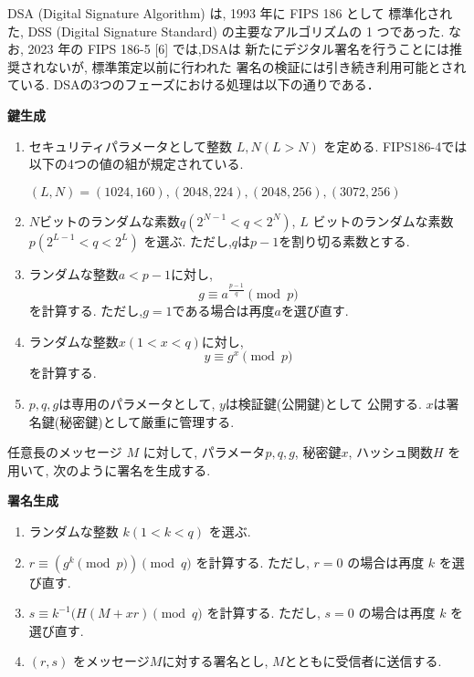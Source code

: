 DSA (Digital Signature Algorithm) は, 1993 年に FIPS 186 として
標準化された, DSS (Digital Signature Standard) の主要なアルゴリズムの
 1 つであった. なお, 2023 年の FIPS 186-5 [6] では,DSAは
新たにデジタル署名を行うことには推奨されないが, 標準策定以前に行われた
署名の検証には引き続き利用可能とされている.
DSAの3つのフェーズにおける処理は以下の通りである．

\let\ltxlist\list
\begin{breakitembox}[l]{\textbf{鍵生成}}
  　
  \begin{enumerate}[parsep=7pt]
    \item セキュリティパラメータとして整数 $L,N (L>N)$ を定める. 
    FIPS186-4では以下の4つの値の組が規定されている.
    \begin{center}
      $(L,N) = (1024,160), (2048,224), (2048,256), (3072,256)$
    \end{center}
    \item $N$ビットのランダムな素数$q(2^{N-1}<q<2^{N})$, 
    $L$ ビットのランダムな素数$p(2^{L-1}<q<2^{L})$ を選ぶ.
    ただし,$q$は$p-1$を割り切る素数とする.
    \item ランダムな整数$a<p-1$に対し,
    \begin{equation}
      g\equiv a^{\frac{p-1}{q}}\pmod p
    \end{equation} 
    を計算する. ただし,$g=1$である場合は再度$a$を選び直す.
    \item ランダムな整数$x(1<x<q)$に対し,
    \begin{equation}
      y\equiv g^x\pmod p
    \end{equation}
    を計算する.
    \item $p,q,g$は専用のパラメータとして, $y$は検証鍵(公開鍵)として
    公開する. $x$は署名鍵(秘密鍵)として厳重に管理する.
  \end{enumerate}
\end{breakitembox}
\vspace{1m}
\indent 任意長のメッセージ $M$ に対して, パラメータ$p, q, g$, 秘密鍵$x$, 
ハッシュ関数$H$ を用いて, 次のように署名を生成する.
\vspace{1em}
\let\ltxlist\list
\begin{breakitembox}[l]{\textbf{署名生成}}
  　
  \begin{enumerate}[parsep=7pt]
    \item ランダムな整数 $k(1<k<q)$ を選ぶ.
    \item $r\equiv (g^k\pmod p)\pmod q$ を計算する. 
    ただし, $r=0$ の場合は再度 $k$ を選び直す.
    \item $s\equiv k^{-1}(H(M+xr)\pmod q$ を計算する.
    ただし, $s=0$ の場合は再度 $k$ を選び直す.
    \item $(r,s)$ をメッセージ$M$に対する署名とし, 
    $M$とともに受信者に送信する.
  \end{enumerate}
\end{breakitembox}
